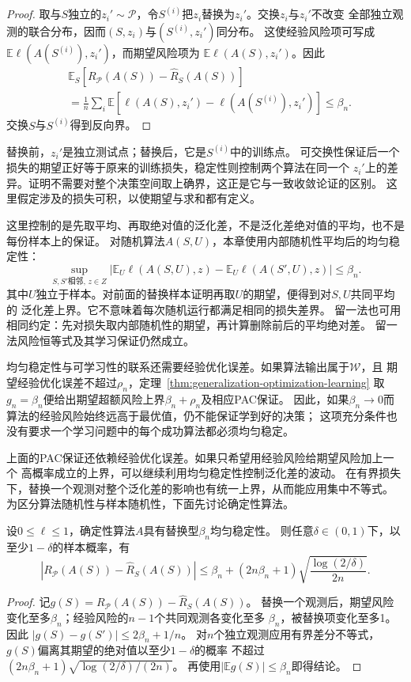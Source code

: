 \begin{proof}
取与$S$独立的$z_i'\sim\mathcal P$，令$S^{(i)}$把$z_i$替换为$z_i'$。交换$z_i$与$z_i'$不改变
全部独立观测的联合分布，因而$(S,z_i)$与$(S^{(i)},z_i')$同分布。
这使经验风险项可写成$\mathbb E\ell(A(S^{(i)}),z_i')$，而期望风险项为
$\mathbb E\ell(A(S),z_i')$。因此
\begin{align*}
 &\mathbb E_S[R_{\mathcal P}(A(S))-\hat R_S(A(S))]\\
 &=\frac1n\sum_i\mathbb E
   [\ell(A(S),z_i')-\ell(A(S^{(i)}),z_i')]
 \leq\beta_n.
\end{align*}
交换$S$与$S^{(i)}$得到反向界。

\end{proof}

替换前，$z_i'$是独立测试点；替换后，它是$S^{(i)}$中的训练点。
可交换性保证后一个损失的期望正好等于原来的训练损失，稳定性则控制两个算法在同一个
$z_i'$上的差异。证明不需要对整个决策空间取上确界，这正是它与一致收敛论证的区别。
这里假定涉及的损失可积，以使期望与求和都有定义。

这里控制的是先取平均、再取绝对值的泛化差，不是泛化差绝对值的平均，也不是每份样本上的保证。
对随机算法$A(S,U)$，本章使用内部随机性平均后的均匀稳定性：
\[
 \sup_{S,S'\text{相邻},\,z\in Z}
 \left|\mathbb E_U\ell(A(S,U),z)-\mathbb E_U\ell(A(S',U),z)\right|\leq\beta_n.
\]
其中$U$独立于样本。对前面的替换样本证明再取$U$的期望，便得到对$S,U$共同平均的
泛化差上界。它不意味着每次随机运行都满足相同的损失差界。
留一法也可用相同约定：先对损失取内部随机性的期望，再计算删除前后的平均绝对差。
留一法风险恒等式及其学习保证仍然成立。

均匀稳定性与可学习性的联系还需要经验优化误差。如果算法输出属于$\mathcal W$，且
期望经验优化误差不超过$\rho_n$，定理~\ref{thm:generalization-optimization-learning}
取$g_n=\beta_n$便给出期望超额风险上界$\beta_n+\rho_n$及相应PAC保证。
因此，如果$\beta_n\to0$而算法的经验风险始终远高于最优值，仍不能保证学到好的决策；
这项充分条件也没有要求一个学习问题中的每个成功算法都必须均匀稳定。

上面的PAC保证还依赖经验优化误差。如果只希望用经验风险给期望风险加上一个
高概率成立的上界，可以继续利用均匀稳定性控制泛化差的波动。
在有界损失下，替换一个观测对整个泛化差的影响也有统一上界，从而能应用集中不等式。
为区分算法随机性与样本随机性，下面先讨论确定性算法。

\begin{theorem}[均匀稳定性的高概率泛化界]
\label{thm:stability-high-probability}
设$0\leq\ell\leq1$，确定性算法$A$具有替换型$\beta_n$均匀稳定性。
则任意$\delta\in(0,1)$下，以至少$1-\delta$的样本概率，有
\[
 |R_{\mathcal P}(A(S))-\hat R_S(A(S))|
 \leq\beta_n+(2n\beta_n+1)\sqrt{\frac{\log(2/\delta)}{2n}}.
\]
\end{theorem}
\begin{proof}
记$g(S)=R_{\mathcal P}(A(S))-\hat R_S(A(S))$。
替换一个观测后，期望风险变化至多$\beta_n$；经验风险的$n-1$个共同观测各变化至多
$\beta_n$，被替换项变化至多1。因此
$|g(S)-g(S')|\leq2\beta_n+1/n$。
对$n$个独立观测应用有界差分不等式，$g(S)$偏离其期望的绝对值以至少$1-\delta$的概率
不超过$(2n\beta_n+1)\sqrt{\log(2/\delta)/(2n)}$。
再使用$|\mathbb E g(S)|\leq\beta_n$即得结论。
\end{proof}

